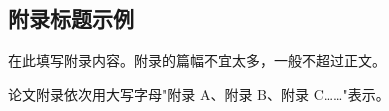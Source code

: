 \documentclass[a4paper,12pt,openright]{book}
\theoremstyle{definition}
\theoremstyle{remark}
\begin{document}
\clearpage{\pagestyle{empty}\cleardoublepage}

\begin{appendices}
\renewcommand{\thechapter}{附录~\Alph{chapter}}

\chapter{附录标题示例}

在此填写附录内容。附录的篇幅不宜太多，一般不超过正文。

论文附录依次用大写字母"附录 A、附录 B、附录 C……"表示。

\end{appendices}
\end{document}
